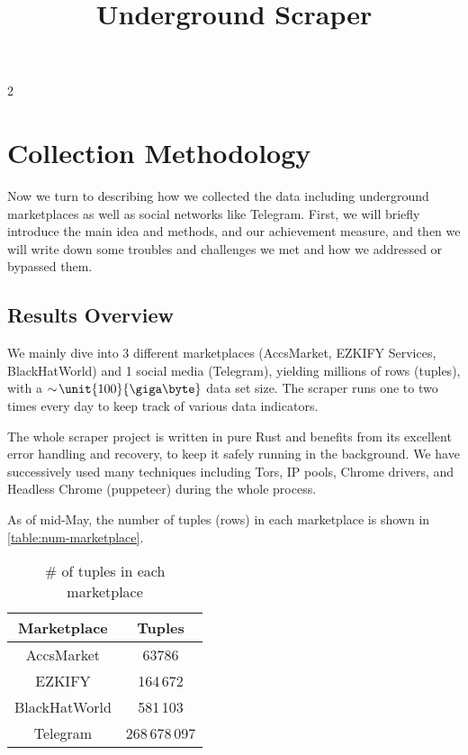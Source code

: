 \documentclass{article}
\title{Underground Scraper}
\begin{document}
	\maketitle
	\addtocounter{section}2
	\section{Collection Methodology}

	Now we turn to describing how we collected the data including underground marketplaces as well as social networks like Telegram.
	First, we will briefly introduce the main idea and methods, and our achievement measure, and then we will write down some troubles and challenges we met and how we addressed or bypassed them.

	\subsection{Results Overview}

	We mainly dive into 3 different marketplaces (AccsMarket, EZKIFY Services, BlackHatWorld) and 1 social media (Telegram), yielding millions of rows (tuples), with a $\sim\!\unit {100} {\giga\byte}$ data set size. The scraper runs one to two times every day to keep track of various data indicators.

	The whole scraper project is written in pure Rust and benefits from its excellent error handling and recovery, to keep it safely running in the background. We have successively used many techniques including Tors\cite{tor}, IP pools, Chrome drivers, and Headless Chrome (puppeteer) during the whole process.

	As of mid-May, the number of tuples (rows) in each marketplace is shown in \autoref{table:num-marketplace}.

	\begin{table}[htb]
		\centering
		\begin{tabular}{|c|c|}
			\hline
				Marketplace & Tuples \\
			\hline\hline
				AccsMarket & 63786 \\
			\hline
				EZKIFY & 164\,672 \\
			\hline
				BlackHatWorld & 581\,103 \\
			\hline
				Telegram & 268\,678\,097 \\
			\hline
		\end{tabular}
		\caption{\# of tuples in each marketplace}
		\label{table:num-marketplace}
	\end{table}
\end{document}
